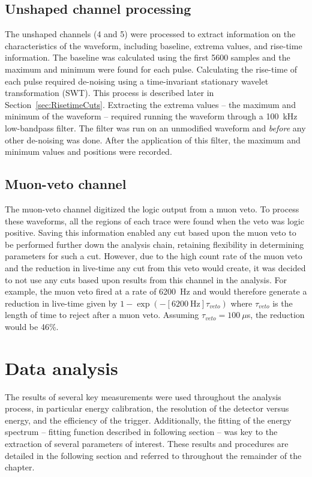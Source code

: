 		\subsection{Unshaped channel processing}
		\label{sec:UnshapedWFProc}

The unshaped channels (4 and 5) were processed to extract information on the characteristics of the waveform, including baseline, extrema values, and rise-time information.    The baseline was calculated using the first 5600 samples and the maximum and minimum were found for each pulse.  Calculating the rise-time of each pulse required de-noising using a time-invariant stationary wavelet transformation (SWT).  This process is described later in Section~\ref{sec:RisetimeCuts}.  Extracting the extrema values -- the maximum and minimum of the waveform -- required running the waveform through a 100~kHz low-bandpass filter.  The filter was run on an unmodified waveform and \emph{before} any other de-noising was done.  After the application of this filter, the maximum and minimum values and positions were recorded.  

		\subsection{Muon-veto channel}
		\label{sec:MuonProc}

The muon-veto channel digitized the logic output from a muon veto.  To process these waveforms, all the regions of each trace were found when the veto was logic positive.  Saving this information enabled any cut based upon the muon veto to be performed further down the analysis chain, retaining flexibility in determining parameters for such a cut.  However, due to the high count rate of the muon veto and the reduction in live-time any cut from this veto would create, it was decided to not use any cuts based upon results from this channel in the analysis.  For example, the muon veto fired at a rate of 6200~Hz and would therefore generate a reduction in live-time given by $1-\exp(- [6200~\text{Hz}]\tau_{veto})$ where $\tau_{veto}$ is the length of time to reject after a muon veto.  Assuming $\tau_{veto}=100~\mu$s, the reduction would be 46\%.


	\section{Data analysis}
	\label{sec:BeGeDataAnalysis}
	
	The results of several key measurements were used throughout the analysis process, in particular energy calibration, the resolution of the detector versus energy, and the efficiency of the trigger.  Additionally, the fitting of the energy spectrum -- fitting function described in following section -- was key to the extraction of several parameters of interest.  These results and procedures are detailed in the following section and referred to throughout the remainder of the chapter.
	
